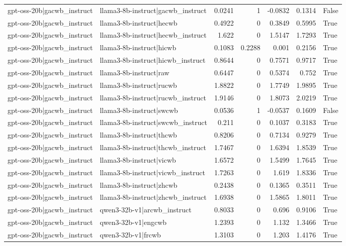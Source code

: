 \begin{table}
\begin{tabular}{l l r r r r l}
gpt-oss-20b|gacwb_instruct & llama3-8b-instruct|gacwb_instruct & 0.0241 & 1 & -0.0832 & 0.1314 & False \\
gpt-oss-20b|gacwb_instruct & llama3-8b-instruct|hecwb & 0.4922 & 0 & 0.3849 & 0.5995 & True \\
gpt-oss-20b|gacwb_instruct & llama3-8b-instruct|hecwb_instruct & 1.622 & 0 & 1.5147 & 1.7293 & True \\
gpt-oss-20b|gacwb_instruct & llama3-8b-instruct|hicwb & 0.1083 & 0.2288 & 0.001 & 0.2156 & True \\
gpt-oss-20b|gacwb_instruct & llama3-8b-instruct|hicwb_instruct & 0.8644 & 0 & 0.7571 & 0.9717 & True \\
gpt-oss-20b|gacwb_instruct & llama3-8b-instruct|raw & 0.6447 & 0 & 0.5374 & 0.752 & True \\
gpt-oss-20b|gacwb_instruct & llama3-8b-instruct|rucwb & 1.8822 & 0 & 1.7749 & 1.9895 & True \\
gpt-oss-20b|gacwb_instruct & llama3-8b-instruct|rucwb_instruct & 1.9146 & 0 & 1.8073 & 2.0219 & True \\
gpt-oss-20b|gacwb_instruct & llama3-8b-instruct|swcwb & 0.0536 & 1 & -0.0537 & 0.1609 & False \\
gpt-oss-20b|gacwb_instruct & llama3-8b-instruct|swcwb_instruct & 0.211 & 0 & 0.1037 & 0.3183 & True \\
gpt-oss-20b|gacwb_instruct & llama3-8b-instruct|thcwb & 0.8206 & 0 & 0.7134 & 0.9279 & True \\
gpt-oss-20b|gacwb_instruct & llama3-8b-instruct|thcwb_instruct & 1.7467 & 0 & 1.6394 & 1.8539 & True \\
gpt-oss-20b|gacwb_instruct & llama3-8b-instruct|vicwb & 1.6572 & 0 & 1.5499 & 1.7645 & True \\
gpt-oss-20b|gacwb_instruct & llama3-8b-instruct|vicwb_instruct & 1.7263 & 0 & 1.619 & 1.8336 & True \\
gpt-oss-20b|gacwb_instruct & llama3-8b-instruct|zhcwb & 0.2438 & 0 & 0.1365 & 0.3511 & True \\
gpt-oss-20b|gacwb_instruct & llama3-8b-instruct|zhcwb_instruct & 1.6938 & 0 & 1.5865 & 1.8011 & True \\
gpt-oss-20b|gacwb_instruct & qwen3-32b-v1|arcwb_instruct & 0.8033 & 0 & 0.696 & 0.9106 & True \\
gpt-oss-20b|gacwb_instruct & qwen3-32b-v1|engcwb & 1.2393 & 0 & 1.132 & 1.3466 & True \\
gpt-oss-20b|gacwb_instruct & qwen3-32b-v1|frcwb & 1.3103 & 0 & 1.203 & 1.4176 & True \\

\end{tabular}
\end{table}
